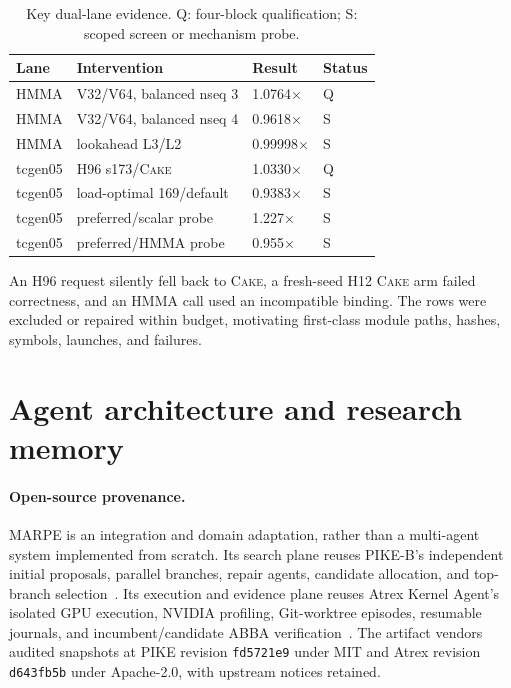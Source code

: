 \documentclass[11pt]{article}
\newcommand{\cake}{\textsc{Cake}}
\begin{document}
\begin{table}[t]
\centering
\caption{Key dual-lane evidence. Q: four-block qualification; S: scoped screen or mechanism probe.}
\label{tab:probe}
\small
\setlength{\tabcolsep}{4pt}
\begin{tabular}{@{}p{}p{}p{}p{}@{}}
\toprule
Lane & Intervention & Result & Status \\
\midrule
HMMA & V32/V64, balanced nseq 3 & 1.0764$\times$ & Q \\
HMMA & V32/V64, balanced nseq 4 & 0.9618$\times$ & S \\
HMMA & lookahead L3/L2 & 0.99998$\times$ & S \\
tcgen05 & H96 s173/\cake{} & 1.0330$\times$ & Q \\
tcgen05 & load-optimal 169/default & 0.9383$\times$ & S \\
tcgen05 & preferred/scalar probe & 1.227$\times$ & S \\
tcgen05 & preferred/HMMA probe & 0.955$\times$ & S \\
\bottomrule
\end{tabular}
\end{table}

An H96 request silently fell back to \cake{}, a fresh-seed H12 \cake{} arm failed correctness, and an HMMA call used an incompatible binding. The rows were excluded or repaired within budget, motivating first-class module paths, hashes, symbols, launches, and failures.

\section{Agent architecture and research memory}

\paragraph{Open-source provenance.}
MARPE is an integration and domain adaptation, rather than a multi-agent system implemented from scratch. Its search plane reuses PIKE-B's independent initial proposals, parallel branches, repair agents, candidate allocation, and top-branch selection~\citep{pike2025}. Its execution and evidence plane reuses Atrex Kernel Agent's isolated GPU execution, NVIDIA profiling, Git-worktree episodes, resumable journals, and incumbent/candidate ABBA verification~\citep{atrex2026}. The artifact vendors audited snapshots at PIKE revision \texttt{fd5721e9} under MIT and Atrex revision \texttt{d643fb5b} under Apache-2.0, with upstream notices retained.
\end{document}
